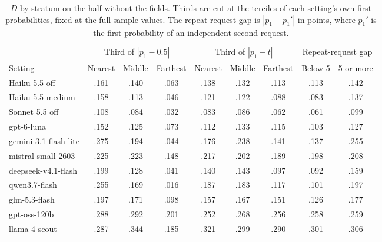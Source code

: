 \begin{table}[t]
\centering
\footnotesize
\setlength{\tabcolsep}{3pt}
\begin{adjustbox}{max width=\linewidth}
\begin{tabular}{lcccccccc}
\toprule
& \multicolumn{3}{c}{Third of $|p_1-0.5|$} & \multicolumn{3}{c}{Third of $|p_1-t|$} & \multicolumn{2}{c}{Repeat-request gap} \\
Setting & Nearest & Middle & Farthest & Nearest & Middle & Farthest & Below 5 & 5 or more \\
\midrule
Haiku 5.5 off & .161 & .140 & .063 & .138 & .132 & .113 & .113 & .142 \\
Haiku 5.5 medium & .158 & .113 & .046 & .121 & .122 & .088 & .083 & .137 \\
Sonnet 5.5 off & .108 & .084 & .032 & .083 & .086 & .062 & .061 & .099 \\
gpt-6-luna & .152 & .125 & .073 & .112 & .133 & .115 & .103 & .127 \\
gemini-3.1-flash-lite & .275 & .194 & .044 & .176 & .238 & .141 & .137 & .255 \\
mistral-small-2603 & .225 & .223 & .148 & .217 & .202 & .189 & .198 & .208 \\
deepseek-v4.1-flash & .199 & .128 & .041 & .140 & .143 & .097 & .092 & .159 \\
qwen3.7-flash & .255 & .169 & .016 & .187 & .183 & .117 & .101 & .197 \\
glm-5.3-flash & .197 & .171 & .098 & .157 & .167 & .151 & .126 & .177 \\
gpt-oss-120b & .288 & .292 & .201 & .252 & .268 & .256 & .258 & .259 \\
llama-4-scout & .287 & .344 & .185 & .321 & .299 & .290 & .301 & .306 \\
\bottomrule
\end{tabular}
\end{adjustbox}
\caption{$D$ by stratum on the half without the fields. Thirds are cut at the terciles of each setting's own first probabilities, fixed at the full-sample values. The repeat-request gap is $|p_1-p_1'|$ in points, where $p_1'$ is the first probability of an independent second request.}
\label{tab:strata}
\end{table}
